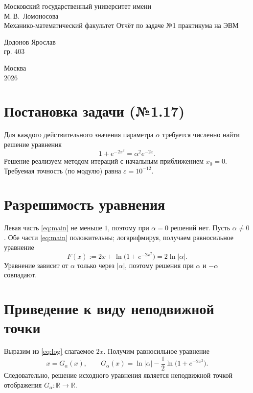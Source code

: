 \documentclass[12pt,a4paper]{article}
\newcommand{\Student}{Додонов Ярослав}
\newcommand{\Group}{гр. 403}
\begin{document}
\begin{titlepage}
\centering
Московский государственный университет имени\\ М.\,В.~Ломоносова\\[8pt]
Механико-математический факультет
\vfill
{\Large Отчёт по задаче №1 практикума на ЭВМ}
\vfill
\begin{flushright}\Student\\ \Group\end{flushright}
\vfill
Москва\\ 2026
\end{titlepage}

\section{Постановка задачи (№1.17)}
Для каждого действительного значения параметра $\alpha$ требуется численно найти решение уравнения
\begin{equation}\label{eq:main}
1+e^{-2x^2}=\alpha^2e^{-2x}.
\end{equation}
Решение реализуем методом итераций с начальным приближением $x_0=0$. Требуемая точность
(по модулю) равна $\varepsilon=10^{-12}$.

\section{Разрешимость уравнения}
Левая часть \eqref{eq:main} не меньше $1$, поэтому при $\alpha=0$ решений нет.
Пусть $\alpha\ne0$. Обе части \eqref{eq:main} положительны; логарифмируя, получаем равносильное уравнение
\begin{equation}\label{eq:log}
F(x):=2x+\ln\bigl(1+e^{-2x^2}\bigr)=2\ln|\alpha| .
\end{equation}
Уравнение зависит от $\alpha$ только через $|\alpha|$, поэтому решения при $\alpha$ и $-\alpha$ совпадают.

\section{Приведение к виду неподвижной точки}
Выразим из \eqref{eq:log} слагаемое $2x$. Получим равносильное уравнение
\begin{equation}\label{eq:fixed}
x=G_\alpha(x),\qquad G_\alpha(x)=\ln|\alpha|-\frac12\ln\bigl(1+e^{-2x^2}\bigr).
\end{equation}
Следовательно, решение исходного уравнения является неподвижной точкой отображения $G_\alpha\colon\mathbb R\to\mathbb R$.
\end{document}
